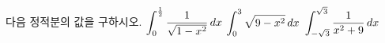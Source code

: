 다음 정적분의 값을 구하시오.
 $\displaystyle\int_{0}^{\frac{1}{2}}\dfrac{1}{\sqrt{1-x^2}}\mkern3mu dx$
 $\displaystyle\int_{0}^{3}\sqrt{9-x^2}\mkern3mu dx$
 $\displaystyle\int_{-\sqrt{3}}^{\sqrt{3}}\dfrac{1}{x^2+9}\mkern3mu dx$
